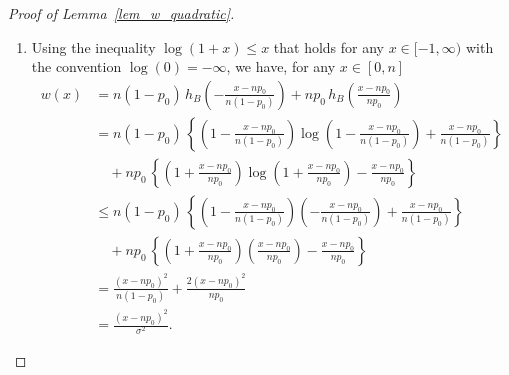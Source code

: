 \documentclass{article}
\begin{document}
\begin{proof}[Proof of Lemma~\ref{lem_w_quadratic}]
\phantom{ }

\begin{enumerate}
    \item 
Using the inequality $\log(1+x) \leq x$ that holds for any $x \in [-1,\infty)$ with the convention $\log(0) = -\infty$, we have, for any $x \in [0,n]$
    \begin{align*}
        w(x) &= n(1-p_0) \, h_B\!\left(-\frac{x-np_0}{n(1-p_0)}\right) + np_0 \, h_B\!\left(\frac{x-np_0}{np_0}\right)\\[5pt]
        & = n(1-p_0) \, \left\{\left(1 - \frac{x-np_0}{n(1-p_0)}\right) \log\left(1-\frac{x-np_0}{n(1-p_0)}\right) + \frac{x-np_0}{n(1-p_0)}\right\} \\[5pt]
        & \quad + np_0 \, \left\{\left(1 + \frac{x-np_0}{np_0}\right) \log\left(1+\frac{x-np_0}{np_0}\right) - \frac{x-np_0}{np_0}\right\}\\[5pt]
        & \leq n(1-p_0) \, \left\{\left(1 - \frac{x-np_0}{n(1-p_0)}\right) \left(-\frac{x-np_0}{n(1-p_0)}\right) + \frac{x-np_0}{n(1-p_0)}\right\} \\[5pt]
        & \quad + np_0 \, \left\{\left(1 + \frac{x-np_0}{np_0}\right) \left(\frac{x-np_0}{np_0}\right) - \frac{x-np_0}{np_0}\right\}\\[5pt]
        & = \frac{(x-np_0)^2}{n(1-p_0)} + \frac{2(x-np_0)^2}{np_0}\\[10pt]
        & = \frac{(x-np_0)^2}{\sigma^2}.
    \end{align*}


\end{enumerate}
\end{proof}
\end{document}
